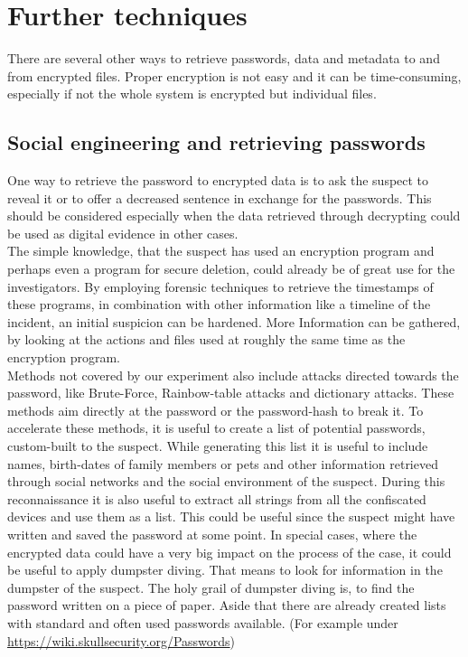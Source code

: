\section{Further techniques}
There are several other ways to retrieve passwords, data and metadata to
and from encrypted files. Proper encryption is not easy and it can be 
time-consuming, especially if not the whole system is encrypted but 
individual files.\\
\subsection{Social engineering and retrieving passwords}
One way to retrieve the password to encrypted data is to ask the suspect
to reveal it or to offer a decreased sentence in exchange for the passwords.
This should be considered especially when the data retrieved through decrypting could be used as digital evidence in other cases.\\
The simple knowledge, that the suspect has used an encryption program and
perhaps even a program for secure deletion, could already be of great use for the
investigators. By employing forensic techniques to retrieve the timestamps 
of these programs, in combination with other information like a timeline
of the incident, an initial suspicion can be hardened. More Information can be
gathered, by looking at the actions and files used at roughly the same time as the encryption program.\\
Methods not covered by our experiment also include attacks directed towards the password, like Brute-Force, Rainbow-table attacks and dictionary attacks.
These methods aim directly at the password or the password-hash to break it.
To accelerate these methods, it is useful to create a list of potential
passwords, custom-built to the suspect. While generating this list it is useful 
to include names, birth-dates of family members or pets and
other information retrieved through social networks and the social 
environment of the suspect.
During this reconnaissance it is also useful to extract all strings from all the confiscated devices and use them as a list. This could be useful since
the suspect might have written and saved the password at some point. In special cases, where the encrypted data could have a very big impact on the process of the case, it could be useful to apply dumpster diving.  That means to look for information in the dumpster of the suspect.
The holy grail of dumpster diving is, to find the password written on a piece of paper.
Aside that there are already created lists with standard and often used passwords
available.
(For example under \url{https://wiki.skullsecurity.org/Passwords})

